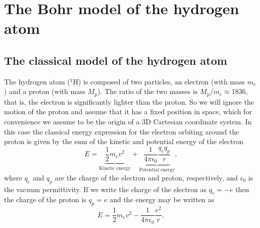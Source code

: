 \documentclass[../Main/chem331-notes.tex]{subfiles}
\begin{document}
\setcounter{section}{1}
\section{The Bohr model of the hydrogen atom}

\subsection{The classical model of the hydrogen atom}
The hydrogen atom ($^1$H) is composed of two particles, an electron (with mass $m_e$) and a proton (with mass $M_p$).
The ratio of the two masses is $M_p/m_e \approx 1836$, that is, the electron is significantly lighter than the proton.
So we will ignore the motion of the proton and assume that it has a fixed position in space, which for convenience we assume to be the origin of a 3D Cartesian coordinate system.
In this case the classical energy expression for the electron orbiting around the proton is given by the sum of the kinetic and potential energy of the electron
\begin{equation}
E = \underbrace{\frac{1}{2} m_e v^2}_{\text{Kinetic energy}}
+ \underbrace{\frac{1}{4 \pi \epsilon_0} \frac{q_e q_p}{r}}_{\text{Potential energy}},
\end{equation}
where $q_e$ and $q_p$ are the charge of the electron and proton, respectively, and $\epsilon_0$ is the vacuum permittivity.
If we write the charge of the electron as $q_e = -e$ then the charge of the proton is $q_p = e$ and the energy may be written as
\begin{equation}
E = \frac{1}{2} m_e v^2 - \frac{1}{4 \pi \epsilon_0} \frac{e^2}{r},
\end{equation}
\end{document}
